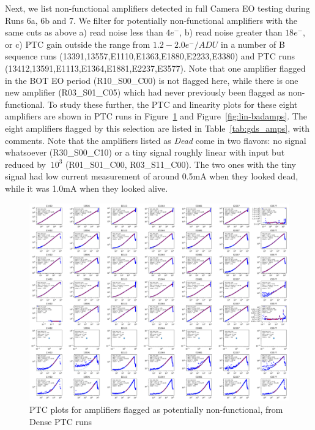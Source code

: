 Next, we list non-functional amplifiers detected in full Camera EO testing during Runs 6a, 6b and 7. We filter for potentially non-functional amplifiers with the same cuts as above a) read noise less than $4e^{-}$, b) read noise greater than $18e^{-}$, or c) PTC gain outside the range from $1.2 - 2.0 e^{-}/ADU$ in a number of B sequence runs (13391,13557,E1110,E1363,E1880,E2233,E3380) and PTC runs (13412,13591,E1113,E1364,E1881,E2237,E3577).  Note that one amplifier flagged in the BOT EO period (R10\_S00\_C00) is not flagged here, while there is one new amplifier (R03\_S01\_C05) which had never previously been flagged as non-functional.  To study these further, the PTC and linearity plots for these eight amplifiers are shown in PTC runs in Figure~\ref{fig:ptc-badamps} and Figure~\ref{fig:lin-badamps}. The eight amplifiers flagged by this selection are listed in Table~\ref{tab:gds_amps}, with comments.  Note that the amplifiers listed as {\it Dead} come in two flavors: no signal whatsoever (R30\_S00\_C10) or a tiny signal roughly linear with input but reduced by $~10^3$ (R01\_S01\_C00, R03\_S11\_C00). The two ones with the tiny signal had low current measurement of around 0.5mA when they looked dead, while it was 1.0mA when they looked alive. 

\begin{figure}[ht]
    \centering
    \includegraphics[width=0.95\linewidth]{figures/ptc_badamps.png}
    \caption{PTC plots for amplifiers flagged as potentially non-functional, from Dense PTC runs}
    \label{fig:ptc-badamps}
\end{figure}

